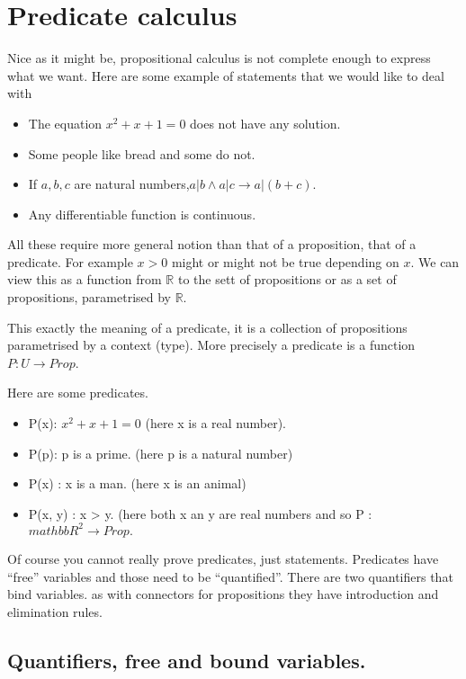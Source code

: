 \section{Predicate calculus}\label{sec:predicatecalculus}

Nice as it might be, propositional calculus is not complete enough to express what we want. Here are some example of statements that we would like to deal with
\begin{itemize}
\item The equation $x^2+x+1=0$ does not have any solution.
\item Some people like bread and some do not.
\item If $a,b, c$ are natural numbers,$a|b \land a | c \rightarrow a | (b+c)$.
\item Any differentiable function is continuous.
\end{itemize}

All these require more general notion than that of a proposition, that of a predicate. 
For example $x>0$ might or might not be true depending on $x$. We can view this as a function from $\mathbb{R}$ to the sett of propositions or as a set of propositions, parametrised by $\mathbb{R}$. 

This exactly the meaning of a predicate, it is a collection of propositions parametrised by a context (type). More precisely a predicate is a function $P: U \rightarrow Prop$. 

Here are some predicates.

\begin{itemize}
\item P(x): $x^{2}+x+1 =0$ (here x is a real number).
\item P(p): p is a prime. (here p is a natural number)
\item P(x) : x is a man. (here x is an animal)
\item P(x, y) : x > y. (here both x an y are real numbers and so P : $mathbb{R}^{2}\rightarrow Prop.$

\end{itemize}	

Of course you cannot really prove predicates, just statements. Predicates have ``free'' variables and those need to be ``quantified''. There are two quantifiers that bind variables. as with connectors for propositions they have introduction and elimination rules.

\subsection{ Quantifiers, free and bound variables.}

